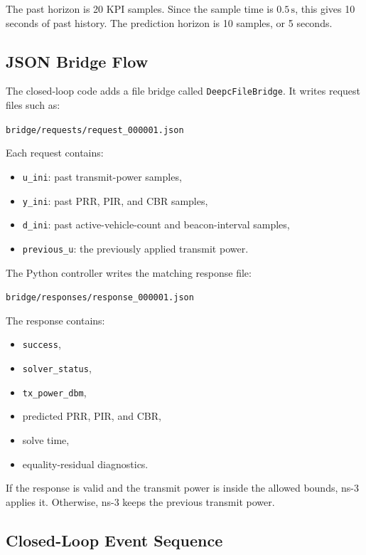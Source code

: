 \documentclass[11pt,a4paper]{article}
\begin{document}
The past horizon is 20 KPI samples. Since the sample time is \(0.5\,\mathrm{s}\), this gives 10 seconds of past history. The prediction horizon is 10 samples, or 5 seconds.

\subsection{JSON Bridge Flow}

The closed-loop code adds a file bridge called \texttt{DeepcFileBridge}. It writes request files such as:

\begin{center}
\texttt{bridge/requests/request\_000001.json}
\end{center}

Each request contains:

\begin{itemize}
    \item \texttt{u\_ini}: past transmit-power samples,
    \item \texttt{y\_ini}: past PRR, PIR, and CBR samples,
    \item \texttt{d\_ini}: past active-vehicle-count and beacon-interval samples,
    \item \texttt{previous\_u}: the previously applied transmit power.
\end{itemize}

The Python controller writes the matching response file:

\begin{center}
\texttt{bridge/responses/response\_000001.json}
\end{center}

The response contains:

\begin{itemize}
    \item \texttt{success},
    \item \texttt{solver\_status},
    \item \texttt{tx\_power\_dbm},
    \item predicted PRR, PIR, and CBR,
    \item solve time,
    \item equality-residual diagnostics.
\end{itemize}

If the response is valid and the transmit power is inside the allowed bounds, ns-3 applies it. Otherwise, ns-3 keeps the previous transmit power.

\subsection{Closed-Loop Event Sequence}
\end{document}
